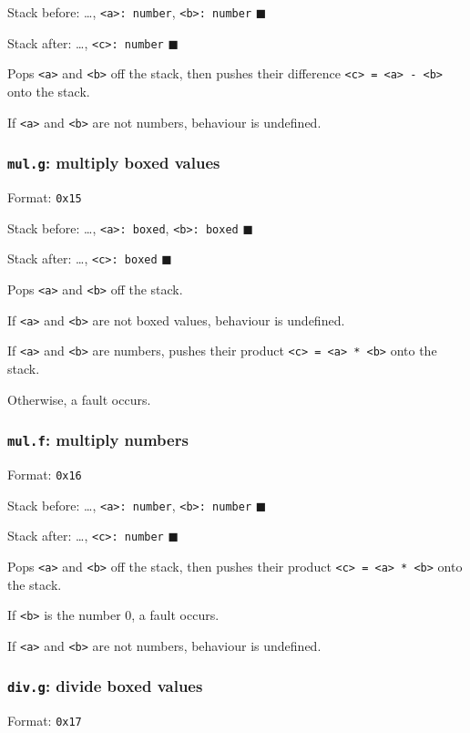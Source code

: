 Stack before: \ldots{}, \texttt{<a>: number}, \texttt{<b>: number} \(\blacksquare\)

Stack after: \ldots{}, \texttt{<c>: number} \(\blacksquare\)

Pops \texttt{<a>} and \texttt{<b>} off the stack, then pushes their difference
\texttt{<c> = <a> - <b>} onto the stack.

If \texttt{<a>} and \texttt{<b>} are not numbers, behaviour is undefined.

\subsubsection{\texttt{mul.g}: multiply boxed values}
\label{sec:org742c65a}
Format: \texttt{0x15}

Stack before: \ldots{}, \texttt{<a>: boxed}, \texttt{<b>: boxed} \(\blacksquare\)

Stack after: \ldots{}, \texttt{<c>: boxed} \(\blacksquare\)

Pops \texttt{<a>} and \texttt{<b>} off the stack.

If \texttt{<a>} and \texttt{<b>} are not boxed values, behaviour is undefined.

If \texttt{<a>} and \texttt{<b>} are numbers, pushes their product \texttt{<c> = <a> * <b>}
onto the stack.

Otherwise, a fault occurs.

\subsubsection{\texttt{mul.f}: multiply numbers}
\label{sec:org29a8cb0}
Format: \texttt{0x16}

Stack before: \ldots{}, \texttt{<a>: number}, \texttt{<b>: number} \(\blacksquare\)

Stack after: \ldots{}, \texttt{<c>: number} \(\blacksquare\)

Pops \texttt{<a>} and \texttt{<b>} off the stack, then pushes their product
\texttt{<c> = <a> * <b>} onto the stack.

If \texttt{<b>} is the number 0, a fault occurs.

If \texttt{<a>} and \texttt{<b>} are not numbers, behaviour is undefined.

\subsubsection{\texttt{div.g}: divide boxed values}
\label{sec:org97eb268}
Format: \texttt{0x17}

